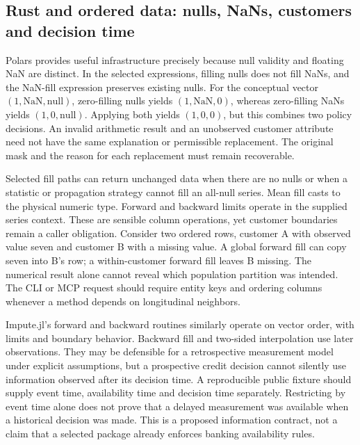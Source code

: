 \subsection{Rust and ordered data: nulls, NaNs, customers and decision time}

Polars provides useful infrastructure precisely because null validity and floating NaN are distinct. In the selected expressions, filling nulls does not fill NaNs, and the NaN-fill expression preserves existing nulls. For the conceptual vector $(1,\mathrm{NaN},\mathrm{null})$, zero-filling nulls yields $(1,\mathrm{NaN},0)$, whereas zero-filling NaNs yields $(1,0,\mathrm{null})$. Applying both yields $(1,0,0)$, but this combines two policy decisions. An invalid arithmetic result and an unobserved customer attribute need not have the same explanation or permissible replacement. The original mask and the reason for each replacement must remain recoverable.\citep{exec25_otm_polars,exec25_otm_choice}

Selected fill paths can return unchanged data when there are no nulls or when a statistic or propagation strategy cannot fill an all-null series. Mean fill casts to the physical numeric type. Forward and backward limits operate in the supplied series context. These are sensible column operations, yet customer boundaries remain a caller obligation. Consider two ordered rows, customer A with observed value seven and customer B with a missing value. A global forward fill can copy seven into B's row; a within-customer forward fill leaves B missing. The numerical result alone cannot reveal which population partition was intended. The CLI or MCP request should require entity keys and ordering columns whenever a method depends on longitudinal neighbors.\citep{exec25_otm_polars,exec25_otm_choice}

Impute.jl's forward and backward routines similarly operate on vector order, with limits and boundary behavior. Backward fill and two-sided interpolation use later observations. They may be defensible for a retrospective measurement model under explicit assumptions, but a prospective credit decision cannot silently use information observed after its decision time. A reproducible public fixture should supply event time, availability time and decision time separately. Restricting by event time alone does not prove that a delayed measurement was available when a historical decision was made. This is a proposed information contract, not a claim that a selected package already enforces banking availability rules.\citep{exec25_otm_imputejl,exec25_otm_choice}

